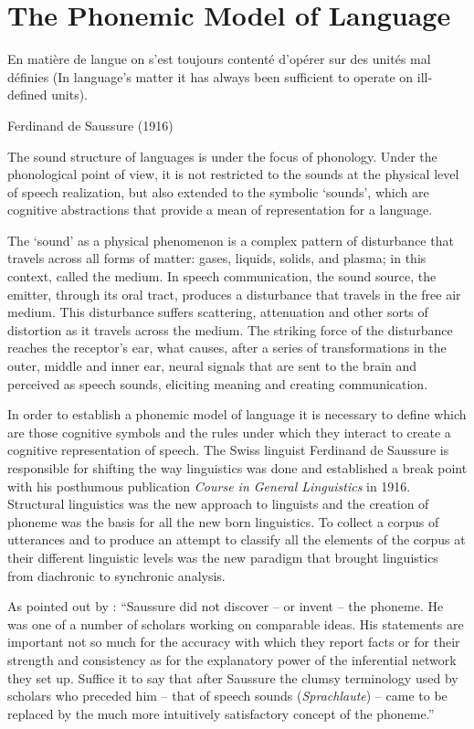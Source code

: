 \chapter{The Phonemic Model of Language}
\epigraph{En matière de langue on s’est toujours contenté d’opérer sur des unités mal définies (In language's matter it has always been sufficient to operate on ill-defined units).}{Ferdinand de Saussure (1916)}

The sound structure of languages is under the focus of phonology. Under the phonological point of view, it is not restricted to the sounds at the physical level of speech realization, but also extended to the symbolic `sounds', which are cognitive abstractions that provide a mean of representation for a language.

The `sound' as a physical phenomenon is a complex pattern of disturbance that travels across all forms of matter: gases, liquids, solids, and plasma; in this context, called the medium. In speech communication, the sound source, the emitter, through its oral tract, produces a disturbance that travels in the free air medium. This disturbance suffers scattering, attenuation and other sorts of distortion as it travels across the medium. The striking force of the disturbance reaches the receptor's ear, what causes, after a series of transformations in the outer, middle and inner ear, neural signals that are sent to the brain and perceived as speech sounds, eliciting meaning and creating communication.

In order to establish a phonemic model of language it is necessary to define which are those cognitive symbols and the rules under which they interact to create a cognitive representation of speech. The Swiss linguist Ferdinand de Saussure is responsible for shifting the way linguistics was done and established a break point with his posthumous publication \textit{Course in General Linguistics} in 1916. Structural linguistics was the new approach to linguists and the creation of phoneme was the basis for all the new born linguistics. To collect a corpus of utterances and to produce an attempt to classify all the elements of the corpus at their different linguistic levels was the new paradigm that brought linguistics from diachronic to synchronic analysis.

As pointed out by \cite{capek1983}: ``Saussure did not discover -- or invent -- the phoneme. He was one of a number of scholars working on comparable ideas. His statements are important not so much for the accuracy with which they report facts or for their strength and consistency as for the explanatory power of the inferential network they set up. Suffice it to say that after Saussure the clumsy terminology used by scholars who preceded him -- that of speech sounds (\textit{Sprachlaute})  -- came to be replaced by the much more intuitively satisfactory concept of the phoneme.''

